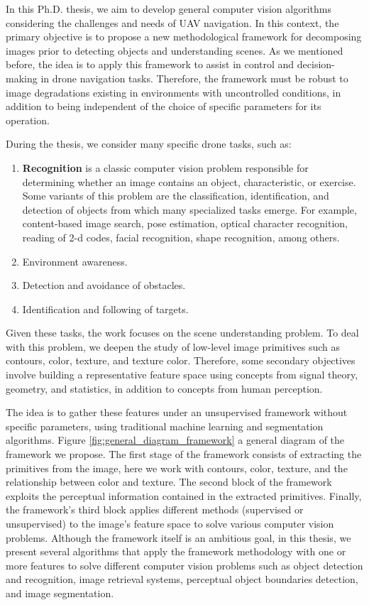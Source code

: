 In this Ph.D. thesis, we aim to develop general computer vision algorithms considering the challenges and needs of UAV navigation. In this context, the primary objective is to propose a new methodological framework for decomposing images prior to detecting objects and understanding scenes. As we mentioned before, the idea is to apply this framework to assist in control and decision-making in drone navigation tasks. Therefore, the framework must be robust to image degradations existing in environments with uncontrolled conditions, in addition to being independent of the choice of specific parameters for its operation.

During the thesis, we consider many specific drone tasks, such as:

\begin{enumerate}[label=\roman*]
	\item \textbf{Recognition} is a classic computer vision problem responsible for determining whether an image contains an object, characteristic, or exercise. Some variants of this problem are the classification, identification, and detection of objects from which many specialized tasks emerge. For example, content-based image search, pose estimation, optical character recognition, reading of 2-d codes, facial recognition, shape recognition, among others.
	\item Environment awareness.
	\item Detection and avoidance of obstacles.
	\item Identification and following of targets.
\end{enumerate}
Given these tasks, the work focuses on the scene understanding problem. To deal with this problem, we deepen the study of low-level image primitives such as contours, color, texture, and texture color. Therefore, some secondary objectives involve building a representative feature space using concepts from signal theory, geometry, and statistics, in addition to concepts from human perception.

The idea is to gather these features under an unsupervised framework without specific parameters, using traditional machine learning and segmentation algorithms. Figure \ref{fig:general_diagram_framework} a general diagram of the framework we propose. The first stage of the framework consists of extracting the primitives from the image, here we work with contours, color, texture, and the relationship between color and texture. The second block of the framework exploits the perceptual information contained in the extracted primitives. Finally, the framework's third block applies different methods (supervised or unsupervised) to the image's feature space to solve various computer vision problems.  Although the framework itself is an ambitious goal, in this thesis, we present several algorithms that apply the framework methodology with one or more features to solve different computer vision problems such as object detection and recognition, image retrieval systems, perceptual object boundaries detection, and image segmentation.

